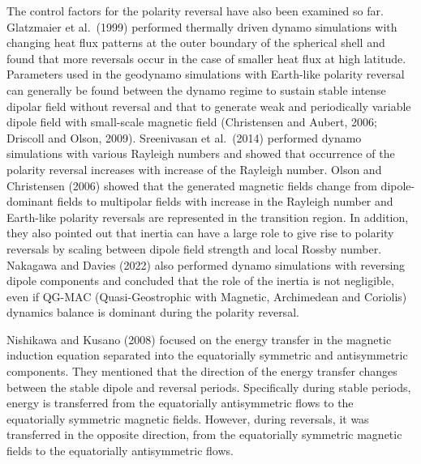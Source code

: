 The control factors for the polarity reversal have also been examined so far.
Glatzmaier et al.\ (1999) %
performed thermally driven dynamo simulations with changing heat flux patterns at the outer boundary of the spherical shell and found that more reversals occur in the case of smaller heat flux at high latitude. 
Parameters used in the geodynamo simulations with Earth-like polarity reversal can generally be found between the dynamo regime to sustain stable intense dipolar field without reversal and that to generate weak and periodically variable dipole field with small-scale magnetic field (Christensen and Aubert, 2006; 
Driscoll and Olson, 2009). %
Sreenivasan et al.\ (2014) %
performed dynamo simulations with various Rayleigh numbers and showed that occurrence of the polarity reversal increases with increase of the Rayleigh number. 
Olson and Christensen (2006) showed that the generated magnetic fields change from dipole-dominant fields to multipolar fields with increase in the Rayleigh number and Earth-like polarity reversals are represented in the transition region.
In addition, they also pointed out that inertia can have a large role to give rise to polarity reversals by scaling between dipole field strength and local Rossby number.
Nakagawa and Davies (2022) 
also performed dynamo simulations with reversing dipole components and concluded that the role of the inertia is not negligible, even if QG-MAC (Quasi-Geostrophic with Magnetic, Archimedean and Coriolis) dynamics balance is dominant during the polarity reversal.

Nishikawa and Kusano (2008) 
focused on the energy transfer in the magnetic induction equation separated into the equatorially symmetric and antisymmetric components. 
They
mentioned that the direction of the energy transfer changes between the stable dipole and reversal periods. 
Specifically during stable periods, energy is transferred from the equatorially antisymmetric flows to the equatorially symmetric magnetic fields. However, during reversals, it was transferred in the opposite direction, from the equatorially symmetric magnetic fields to the equatorially antisymmetric flows.


